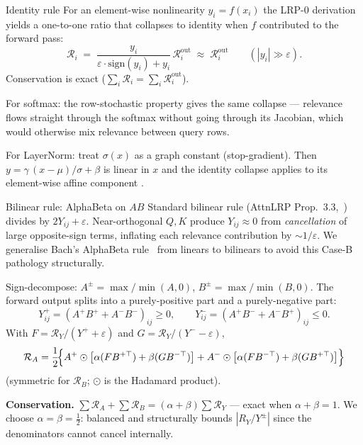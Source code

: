 \documentclass[
  aspectratio=169,
]{beamer}
\newcommand{\eps}{\varepsilon}
\newcommand{\Rel}{\mathcal{R}}
\newcommand{\half}{\frac{1}{2}}
\begin{document}
\begin{frame}{Identity rule}
For an element-wise nonlinearity $y_i = f(x_i)$ the LRP-0 derivation
yields a one-to-one ratio that collapses to identity when $f$
contributed to the forward pass:
\[
  \Rel_i \;=\; \frac{y_i}{\eps\cdot\mathrm{sign}(y_i) + y_i}\, \Rel^{\mathrm{out}}_i
  \;\approx\; \Rel^{\mathrm{out}}_i \qquad (|y_i| \gg \eps).
\]
Conservation is exact ($\sum_i \Rel_i = \sum_i \Rel^{\mathrm{out}}_i$).

\smallskip
For \alert{softmax}: the row-stochastic property gives the same
collapse \cite{achtibat2024attnlrp} — relevance flows straight
through the softmax without going through its Jacobian, which would
otherwise mix relevance between query rows.

\smallskip
For \alert{LayerNorm}: treat $\sigma(x)$ as a graph constant
(stop-gradient). Then $y = \gamma\,(x-\mu)/\sigma + \beta$ is linear
in $x$ and the identity collapse applies to its element-wise affine
component \cite{achtibat2024attnlrp}.
\end{frame}

\begin{frame}{Bilinear rule: AlphaBeta on $A B$}
Standard bilinear rule (AttnLRP Prop.~3.3,~\cite{achtibat2024attnlrp})
divides by $2Y_{ij} + \eps$. Near-orthogonal $Q,K$ produce $Y_{ij}
\approx 0$ from \emph{cancellation} of large opposite-sign terms,
inflating each relevance contribution by $\sim 1/\eps$. We generalise
Bach's AlphaBeta rule~\cite{bach2015lrp} from linears to bilinears
to avoid this Case-B pathology structurally.

Sign-decompose: $A^\pm = \max/\min(A, 0)$, $B^\pm = \max/\min(B, 0)$.
The forward output splits into a purely-positive part and a
purely-negative part:
\[
  Y^+_{ij} = (A^+B^+ + A^-B^-)_{ij} \geq 0, \qquad
  Y^-_{ij} = (A^+B^- + A^-B^+)_{ij} \leq 0 .
\]
With $F = \Rel_Y / (Y^+ + \eps)$ and $G = \Rel_Y / (Y^- - \eps)$,
\[
  \Rel_A = \half \!\Bigl\{ A^+ \odot \bigl[\alpha (F B^{+\top}) + \beta (G B^{-\top})\bigr]
                          + A^- \odot \bigl[\alpha (F B^{-\top}) + \beta (G B^{+\top})\bigr] \Bigr\}
\]
(symmetric for $\Rel_B$; $\odot$ is the Hadamard product).

\smallskip
\textbf{Conservation.} $\sum \Rel_A + \sum \Rel_B = (\alpha+\beta)\sum \Rel_Y$ — exact when $\alpha+\beta=1$.
We choose $\alpha=\beta=\half$: balanced and structurally bounds
$|R_Y/Y^\pm|$ since the denominators cannot cancel internally.
\end{frame}
\end{document}
